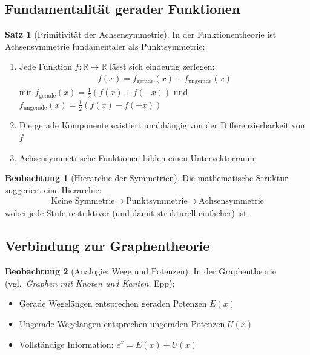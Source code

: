 ﻿\documentclass[a4paper,12pt]{article}
\theoremstyle{definition}
\newtheorem{satz}{Satz}
\newtheorem{beobachtung}{Beobachtung}
\begin{document}
\subsection{Fundamentalität gerader Funktionen}

\begin{satz}[Primitivität der Achsensymmetrie]
In der Funktionentheorie ist Achsensymmetrie fundamentaler als Punktsymmetrie:
\begin{enumerate}
  \item Jede Funktion $f: \mathbb{R} \to \mathbb{R}$ lässt sich eindeutig
        zerlegen:
        \begin{align}
          f(x) = f_{\text{gerade}}(x) + f_{\text{ungerade}}(x)
        \end{align}
        mit $f_{\text{gerade}}(x) = \tfrac{1}{2}(f(x)+f(-x))$ und
        $f_{\text{ungerade}}(x) = \tfrac{1}{2}(f(x)-f(-x))$
  \item Die gerade Komponente existiert unabhängig von der
        Differenzierbarkeit von $f$
  \item Achsensymmetrische Funktionen bilden einen Untervektorraum
\end{enumerate}
\end{satz}

\begin{beobachtung}[Hierarchie der Symmetrien]
Die mathematische Struktur suggeriert eine Hierarchie:
\begin{align}
  \text{Keine Symmetrie} \supset \text{Punktsymmetrie}
  \supset \text{Achsensymmetrie}
\end{align}
wobei jede Stufe restriktiver (und damit strukturell einfacher) ist.
\end{beobachtung}

\subsection{Verbindung zur Graphentheorie}

\begin{beobachtung}[Analogie: Wege und Potenzen]
In der Graphentheorie (vgl.\ \emph{Graphen mit Knoten und Kanten}, Epp):
\begin{itemize}
  \item[-] Gerade Wegelängen entsprechen geraden Potenzen $E(x)$
  \item[-] Ungerade Wegelängen entsprechen ungeraden Potenzen $U(x)$
  \item[-] Vollständige Information: $e^x = E(x) + U(x)$
\end{itemize}
\end{beobachtung}
\end{document}
